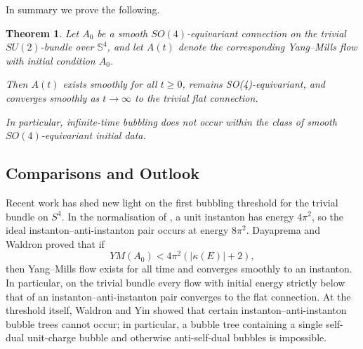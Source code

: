 \documentclass[11pt,a4paper]{article}
\numberwithin{equation}{section}
\theoremstyle{plain}
\newtheorem{theorem}{Theorem}[section]
\theoremstyle{remark}
\begin{document}
In summary we prove the following.
\begin{theorem}\label{1.1}
Let $A_0$ be a smooth $SO(4)$-equivariant connection on the trivial $SU(2)$-bundle over $\mathbb{S}^4$, and let $A(t)$ denote the corresponding Yang--Mills flow with initial condition $A_0$.

Then $A(t)$ exists smoothly for all $t\ge0$, remains SO(4)-equivariant, and converges smoothly as $t\to\infty$ to the trivial flat connection. 

In particular, infinite-time bubbling does not occur within the class of smooth $SO(4)$-equivariant initial data.
\end{theorem}

\subsection{Comparisons and Outlook}
Recent work has shed new light on the first bubbling threshold for the trivial bundle on $S^4$. In the normalisation of \cite{dayaprema2026parabolicgaptheoremsyangmills}, a unit instanton has energy $4\pi^2$, so the ideal instanton--anti-instanton pair occurs at energy $8\pi^2$. Dayaprema and Waldron \cite{dayaprema2026parabolicgaptheoremsyangmills} proved that if
$$
YM(A_0)<4\pi^2(|\kappa(E)|+2),
$$
then Yang--Mills flow exists for all time and converges smoothly to an instanton. In particular, on the trivial bundle every flow with initial energy strictly below that of an instanton--anti-instanton pair converges to the flat connection. At the threshold itself, Waldron and Yin \cite{waldron2026yangmillsequationnearinstantonantiinstanton} showed that certain instanton--anti-instanton bubble trees cannot occur; in particular, a bubble tree containing a single self-dual unit-charge bubble and otherwise anti-self-dual bubbles is impossible.
\end{document}
